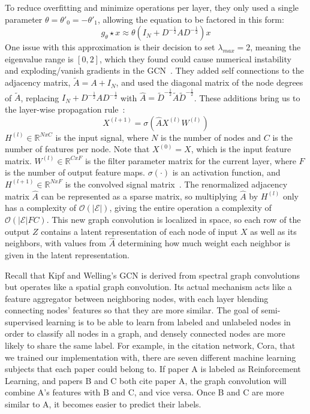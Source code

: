 To reduce overfitting and minimize operations per layer, they only used a single parameter $\theta = \theta'_0 = -\theta'_1$, allowing the equation to be factored in this form:
\begin{equation} 
\label{single_param}
g_\theta \star x \approx \theta(I_N + D^{-\frac{1}{2}}AD^{-\frac{1}{2}})x
\end{equation}
One issue with this approximation is their decision to set $\lambda_{max} = 2$, meaning the eigenvalue range is $[0,2]$, which they found could cause numerical instability and exploding/vanish gradients in the GCN~\cite{Kipf2016}. They added self connections to the adjacency matrix, $\tilde{A} = A + I_N$, and used the diagonal matrix of the node degrees of $\tilde{A}$, replacing $I_N + D^{-\frac{1}{2}}AD^{-\frac{1}{2}}$ with $\hat{A} = \tilde{D}^{-\frac{1}{2}}\tilde{A}\tilde{D}^{-\frac{1}{2}}$. These additions bring us to the layer-wise propagation rule~\cite{Kipf2016}:
\begin{equation}
\label{prop_rule}
X^{(l+1)} = \sigma(\hat{A}X^{(l)}W^{(l)})
\end{equation}
$H^{(l)} \in \mathbb{R}^{N x C}$ is the input signal, where $N$ is the number of nodes and $C$ is the number of features per node. Note that $X^{(0)} = X$, which is the input feature matrix. $W^{(l)} \in \mathbb{R}^{C x F}$ is the filter parameter matrix for the current layer, where $F$ is the number of output feature maps. $\sigma(\cdot)$ is an activation function, and $H^{(l+1)} \in \mathbb{R}^{N x F}$ is the convolved signal matrix~\cite{Kipf2016}. The renormalized adjacency matrix $\hat{A}$ can be represented as a sparse matrix, so multiplying $\hat{A}$ by $H^{(l)}$ only has a complexity of $\mathcal{O}(|\mathcal{E}|)$, giving the entire operation a complexity of $\mathcal{O}(|\mathcal{E}|FC)$.  This new graph convolution is localized in space, so each row of the output $Z$ contains a latent representation of each node of input $X$ as well as its neighbors, with values from $\hat{A}$ determining how much weight each neighbor is given in the latent representation.

Recall that Kipf and Welling's GCN is derived from spectral graph convolutions but operates like a spatial graph convolution. Its actual mechanism acts like a feature aggregator between neighboring nodes, with each layer blending connecting nodes' features so that they are more similar. The goal of semi-supervised learning is to be able to learn from labeled and unlabeled nodes in order to classify all nodes in a graph, and densely connected nodes are more likely to share the same label. For example, in the citation network, Cora, that we trained our implementation with, there are seven different machine learning subjects that each paper could belong to. If paper A is labeled as Reinforcement Learning, and papers B and C both cite paper A, the graph convolution will combine A's features with B and C, and vice versa. Once B and C are more similar to A, it becomes easier to predict their labels.

